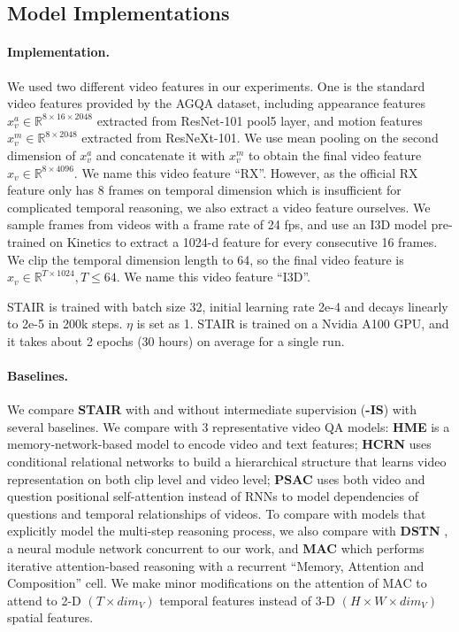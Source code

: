 \documentclass[letterpaper]{article} %
\begin{document}
\subsection{Model Implementations}
\paragraph{Implementation.} We used two different video features in our experiments. One is the standard video features provided by the AGQA dataset, including appearance features $x_v^a \in \mathbb{R}^{8 \times 16 \times 2048}$ extracted from ResNet-101 pool5 layer\cite{He2015DeepRL}, and motion features $x_v^m \in \mathbb{R}^{8 \times 2048}$ extracted from ResNeXt-101\cite{Xie2016AggregatedRT}. We use mean pooling on the second dimension of $x_v^a$ and concatenate it with $x_v^m$ to obtain the final video feature $x_v \in \mathbb{R}^{8 \times 4096}$. We name this video feature ``RX''. However, as the official RX feature only has 8 frames on temporal dimension which is insufficient for complicated temporal reasoning, we also extract a video feature ourselves. We sample frames from videos with a frame rate of 24 fps, and use an I3D model pre-trained on Kinetics \cite{Carreira2017QuoVA} to extract a 1024-d feature for every consecutive 16 frames. We clip the temporal dimension length to 64, so the final video feature is $x_v \in \mathbb{R}^{T \times 1024}, T\leq64$. We name this video feature ``I3D''.

STAIR is trained with batch size 32, initial learning rate 2e-4 and decays linearly to 2e-5 in 200k steps. $\eta$ is set as 1. STAIR is trained on a Nvidia A100 GPU, and it takes about 2 epochs (30 hours) on average for a single run.

\paragraph{Baselines.} We compare \textbf{STAIR} with and without intermediate supervision (\textbf{-IS}) with several baselines. We compare with 3 representative video QA models: \textbf{HME} \cite{Fan2019HeterogeneousME} is a memory-network-based model to encode video and text features; \textbf{HCRN} \cite{Le2020HierarchicalCR} uses conditional relational networks to build a hierarchical structure that learns video representation on both clip level and video level; \textbf{PSAC} \cite{Li2019BeyondRP} uses both video and question positional self-attention instead of RNNs to model dependencies of questions and temporal relationships of videos.
To compare with models that explicitly model the multi-step reasoning process, we also compare with \textbf{DSTN} \cite{Qian2022DynamicSM}, a neural module   network concurrent to our work, and \textbf{MAC} \cite{hudson2018compositional} which performs iterative attention-based reasoning with a recurrent ``Memory, Attention and Composition'' cell. We make minor modifications on the attention of MAC to attend to 2-D $(T \times dim_V)$ temporal features instead of 3-D $(H \times W \times dim_V)$ spatial features.
\end{document}
